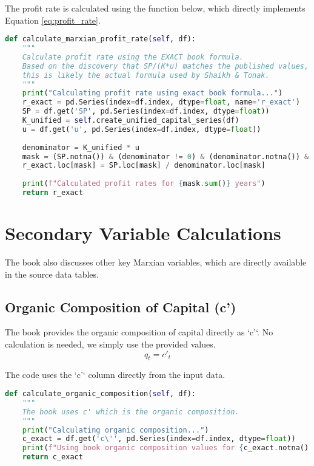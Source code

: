 \documentclass[12pt,a4paper]{article}
\begin{document}
\begin{tcolorbox}[colback=red!5!white,colframe=red!75!black,title=Implementation for Equation \ref{eq:profit_rate}]
The profit rate is calculated using the function below, which directly implements Equation \ref{eq:profit_rate}.
\begin{lstlisting}[language=Python, caption=Profit Rate Calculation, label=code:profit_rate]
def calculate_marxian_profit_rate(self, df):
    """
    Calculate profit rate using the EXACT book formula.
    Based on the discovery that SP/(K*u) matches the published values,
    this is likely the actual formula used by Shaikh & Tonak.
    """
    print("Calculating profit rate using exact book formula...")
    r_exact = pd.Series(index=df.index, dtype=float, name='r_exact')
    SP = df.get('SP', pd.Series(index=df.index, dtype=float))
    K_unified = self.create_unified_capital_series(df)
    u = df.get('u', pd.Series(index=df.index, dtype=float))
    
    denominator = K_unified * u
    mask = (SP.notna()) & (denominator != 0) & (denominator.notna()) & (u.notna())
    r_exact.loc[mask] = SP.loc[mask] / denominator.loc[mask]
    
    print(f"Calculated profit rates for {mask.sum()} years")
    return r_exact
\end{lstlisting}
\end{tcolorbox}

\section{Secondary Variable Calculations}
The book also discusses other key Marxian variables, which are directly available in the source data tables.

\subsection{Organic Composition of Capital (c')}
The book provides the organic composition of capital directly as `c'`. No calculation is needed, we simply use the provided values.
\begin{equation}
q_t = c'_t 
\end{equation}

\begin{tcolorbox}[colback=orange!5!white,colframe=orange!75!black,title=Implementation for Organic Composition]
The code uses the `c'` column directly from the input data.
\begin{lstlisting}[language=Python, caption=Organic Composition of Capital, label=code:organic_composition]
def calculate_organic_composition(self, df):
    """
    The book uses c' which is the organic composition.
    """
    print("Calculating organic composition...")
    c_exact = df.get('c\'', pd.Series(index=df.index, dtype=float))
    print(f"Using book organic composition values for {c_exact.notna().sum()} years")
    return c_exact
\end{lstlisting}
\end{tcolorbox}
\end{document}
